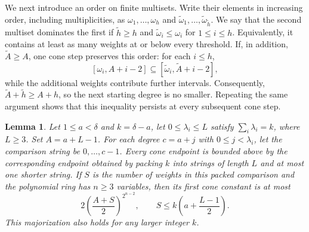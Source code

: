 \documentclass[12pt]{amsart}
\numberwithin{equation}{section}
\newtheorem{lemma}[theorem]{Lemma}
\theoremstyle{definition}
\theoremstyle{remark}
\numberwithin{equation}{section}
\begin{document}
We next introduce an order on finite multisets. Write their elements in increasing order, including multiplicities, as $\omega_1,\ldots,\omega_h$ and
$\widetilde\omega_1,\ldots,\widetilde\omega_{\widetilde h}$. We say that the second multiset dominates the first if $\widetilde h\ge h$ and
$\widetilde\omega_i\le\omega_i$ for $1\le i\le h$.
Equivalently, it contains at least as many weights at or below every threshold. If, in addition, $\widetilde A\ge A$, one cone step preserves this order: for each $i\le h$,
\[
 [\omega_i,A+i-2]
 \subseteq
 [\widetilde\omega_i,\widetilde A+i-2],
\]
while the additional weights contribute further intervals. Consequently, $\widetilde A+\widetilde h\ge A+h$, so the next starting
degree is no smaller. Repeating the same argument shows that this inequality persists at every subsequent cone step.
\begin{lemma}\label{lem:packed-cones}
	Let $1\le a<\delta$ and $k=\delta-a$, let $0\le\lambda_i\le L$ satisfy $\sum_i\lambda_i=k$, where $L\ge3$. Set $A=a+L-1$. For each degree $c=a+j$ with
	$0\le j<\lambda_i$, let the comparison string be $0,\ldots,c-1$. Every cone endpoint is bounded above by the corresponding endpoint
	obtained by packing $k$ into strings of length $L$ and at most one shorter string. If $S$ is the number of weights in this packed
	comparison and the polynomial ring has $n\ge3$ variables, then its first cone constant is at most
	\[
	2\left(\frac{A+S}{2}\right)^{2^{n-2}},\qquad S\le k\left(a+\frac{L-1}{2}\right).
	\]
This majorization also holds for any larger integer $k$.
\end{lemma}
\end{document}
